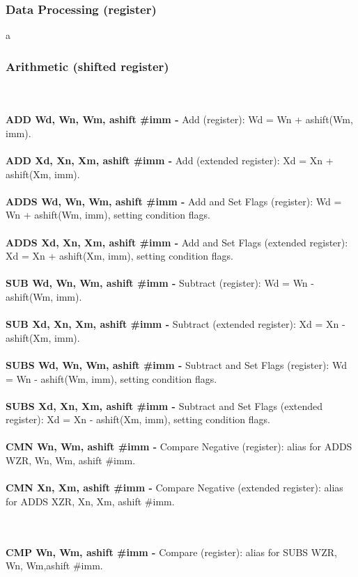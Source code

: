 \documentclass[12pt,a4paper,utf8]{ppgsi}
\begin{document}
\subsubsection{Data Processing (register)}
a

\subsubsection{Arithmetic (shifted register)}
\\\\\textbf{ADD Wd, Wn, Wm{, ashift \#imm} -} Add (register): Wd = Wn + ashift(Wm, imm).
\\\\\textbf{ADD Xd, Xn, Xm{, ashift \#imm} -} Add (extended register): Xd = Xn + ashift(Xm, imm). 
\\\\\textbf{ADDS Wd, Wn, Wm{, ashift \#imm} -} Add and Set Flags (register): Wd = Wn + ashift(Wm, imm), setting condition flags. 
\\\\\textbf{ADDS Xd, Xn, Xm{, ashift \#imm} -} Add and Set Flags (extended register): Xd = Xn + ashift(Xm, imm), setting condition flags. 
\\\\\textbf{SUB Wd, Wn, Wm{, ashift \#imm} -} Subtract (register): Wd = Wn - ashift(Wm, imm). 
\\\\\textbf{SUB Xd, Xn, Xm{, ashift \#imm} -} Subtract (extended register): Xd = Xn - ashift(Xm, imm). 
\\\\\textbf{SUBS Wd, Wn, Wm{, ashift \#imm} -} Subtract and Set Flags (register): Wd = Wn - ashift(Wm, imm), setting condition flags. 
\\\\\textbf{SUBS Xd, Xn, Xm{, ashift \#imm} -} Subtract and Set Flags (extended register): Xd = Xn - ashift(Xm, imm), setting condition flags. 
\\\\\textbf{CMN Wn, Wm{, ashift \#imm} -} Compare Negative (register): alias for ADDS WZR, Wn, Wm{, ashift \#imm}. 
\\\\\textbf{CMN Xn, Xm{, ashift \#imm} -} Compare Negative (extended register): alias for ADDS XZR, Xn, Xm{, ashift \#imm}. 

\\\\\textbf{CMP Wn, Wm{, ashift \#imm} -} Compare (register): alias for SUBS WZR, Wn, Wm{,ashift \#imm}. 
\end{document}
